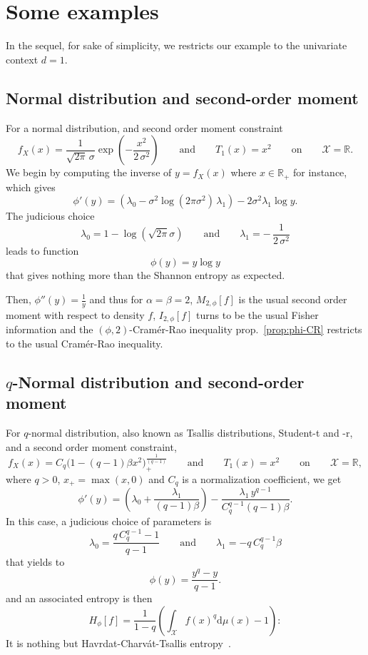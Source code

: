 \documentclass[english,sort&compress]{elsarticle}
\theoremstyle{definition}
\theoremstyle{plain}
\theoremstyle{plain}
\def\dmu{\mathrm{d}\mu}
\def\Rset{\mathbb{R}}
\def\X{\mathcal{X}}
\begin{document}

\section{Some examples}
\label{sec:Examples}

In  the  sequel,  for sake  of  simplicity,  we  restricts  our example  to  the
univariate context $d = 1$.


\subsection{Normal distribution and second-order moment}
\label{subsec:NormalSecondOrder}

For a normal distribution, and second order moment constraint 
%
\[
f_X(x)  = \frac{1}{\sqrt{2\pi} \,\sigma}  \exp\left( -\frac{x^2}{2  \, \sigma^2}
\right)  \qquad \mbox{and}  \qquad T_1(x)  = x^2  \qquad \mbox{on}  \qquad  \X =
\Rset.
\]
%
We begin  by computing the  inverse of  $y = f_X(x)$  where $x \in  \Rset_+$ for
instance, which gives
%
\[
\phi'(y) = \left( \lambda_0 - \sigma^2 \log(2 \pi \sigma^2) \, \lambda_1 \right)
- 2 \sigma^2 \lambda_1 \log y.
\]
%
The judicious choice
%
\[
\lambda_0 = 1 - \log( \sqrt{2\pi}  \sigma ) \qquad \mbox{and} \qquad \lambda_1 =
- \, \frac{1}{2 \, \sigma^2}
\]
%
leads to function
%
\[
\phi(y) = y \log y
\]
%
that gives nothing more than the Shannon entropy as expected.

Then,  $\phi''(y)   =  \frac{1}{y}$  and  thus   for  $\alpha  =   \beta  =  2$,
$M_{2,\phi}[f]$ is  the usual second order  moment with respect  to density $f$,
$I_{2,\phi}[f]$   turns   to  be   the   usual   Fisher   information  and   the
$(\phi,2)$-Cram\'er-Rao  inequality  prop.~\ref{prop:phi-CR}  restricts  to  the
usual Cram\'er-Rao inequality.



\subsection{$q$-Normal distribution and second-order moment}
\label{subsec:qNormalSecondOrder}

For $q$-normal distribution, also  known as Tsallis distributions, Student-t and
-r, and a second order moment constraint,
%
\[
f_X(x)  = C_q  \Big( 1  - (q-1)  \beta x^2  \Big)_{\!+}^{\frac{1}{(q-1)}} \qquad
\mbox{and} \qquad T_1(x) = x^2 \qquad \mbox{on} \qquad \X = \Rset,
\]
%
where $q  > 0$, $x_+ = \max(x,0)$  and $C_q$ is a  normalization coefficient, we
get
%
\[
\phi'(y)  =   \left(  \lambda_0   +  \frac{\lambda_1}{(q-1)  \beta}   \right)  -
\frac{\lambda_1 \, y^{q-1}}{C_q^{q-1} (q-1) \beta}.
\]
%
In this case, a judicious choice of parameters is
%
\[
\lambda_0 = \frac{q \, C_q^{q-1}  - 1}{q-1} \qquad \mbox{and} \qquad \lambda_1 =
-q \, C_q^{q-1} \beta
\]
%
that yields to 
%
\[
\phi(y) = \frac{y^q-y}{q-1}.
\]
%
and an associated entropy is then 
%
\[
H_\phi[f] = \frac{1}{1-q} \left( \int_\X f(x)^q \dmu(x) - 1 \right):
\]
%
It  is  nothing  but  Havrdat-Charv\'at-Tsallis  entropy~\cite{HavCha67,  Dar70,
  Tsa88, CosHer03}.
\end{document}
